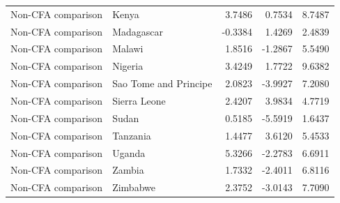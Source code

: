 \begin{table}
\begin{tabular}[t]{llrrr}
Non-CFA comparison & Kenya & 3.7486 & 0.7534 & 8.7487\\
\addlinespace
Non-CFA comparison & Madagascar & -0.3384 & 1.4269 & 2.4839\\
Non-CFA comparison & Malawi & 1.8516 & -1.2867 & 5.5490\\
Non-CFA comparison & Nigeria & 3.4249 & 1.7722 & 9.6382\\
Non-CFA comparison & Sao Tome and Principe & 2.0823 & -3.9927 & 7.2080\\
Non-CFA comparison & Sierra Leone & 2.4207 & 3.9834 & 4.7719\\
\addlinespace
Non-CFA comparison & Sudan & 0.5185 & -5.5919 & 1.6437\\
Non-CFA comparison & Tanzania & 1.4477 & 3.6120 & 5.4533\\
Non-CFA comparison & Uganda & 5.3266 & -2.2783 & 6.6911\\
Non-CFA comparison & Zambia & 1.7332 & -2.4011 & 6.8116\\
Non-CFA comparison & Zimbabwe & 2.3752 & -3.0143 & 7.7090\\
\bottomrule
\end{tabular}
\end{table}